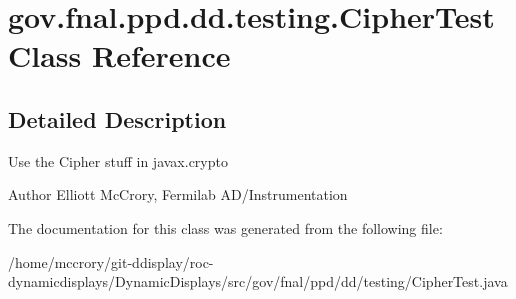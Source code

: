 \hypertarget{classgov_1_1fnal_1_1ppd_1_1dd_1_1testing_1_1CipherTest}{\section{gov.\-fnal.\-ppd.\-dd.\-testing.\-Cipher\-Test Class Reference}
\label{classgov_1_1fnal_1_1ppd_1_1dd_1_1testing_1_1CipherTest}
}


\subsection{Detailed Description}
Use the Cipher stuff in javax.\-crypto

\begin{DoxyAuthor}{Author}
Elliott Mc\-Crory, Fermilab A\-D/\-Instrumentation 
\end{DoxyAuthor}


The documentation for this class was generated from the following file\-:\begin{DoxyCompactItemize}
\item 
/home/mccrory/git-\/ddisplay/roc-\/dynamicdisplays/\-Dynamic\-Displays/src/gov/fnal/ppd/dd/testing/Cipher\-Test.\-java\end{DoxyCompactItemize}
